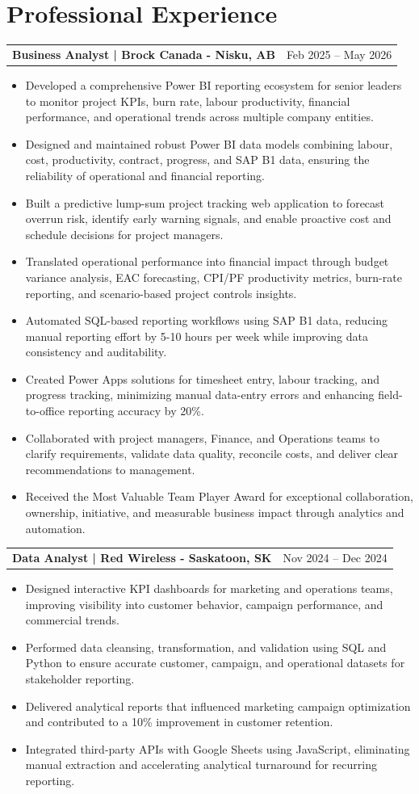 \documentclass[10.5pt,letterpaper]{article}
\makeatletter
\newcommand{\resumeRow}[2]{%
  \noindent\begin{tabularx}{\linewidth}{@{}X r@{}}
    \textbf{#1} & #2 \\
  \end{tabularx}%
}
\makeatother
\begin{document}
\section{Professional Experience}
\resumeRow{Business Analyst | Brock Canada - Nisku, AB}{Feb 2025 -- May 2026}
\begin{itemize}
  \item Developed a comprehensive Power BI reporting ecosystem for senior leaders to monitor project KPIs, burn rate, labour productivity, financial performance, and operational trends across multiple company entities.
  \item Designed and maintained robust Power BI data models combining labour, cost, productivity, contract, progress, and SAP B1 data, ensuring the reliability of operational and financial reporting.
  \item Built a predictive lump-sum project tracking web application to forecast overrun risk, identify early warning signals, and enable proactive cost and schedule decisions for project managers.
  \item Translated operational performance into financial impact through budget variance analysis, EAC forecasting, CPI/PF productivity metrics, burn-rate reporting, and scenario-based project controls insights.
  \item Automated SQL-based reporting workflows using SAP B1 data, reducing manual reporting effort by 5-10 hours per week while improving data consistency and auditability.
  \item Created Power Apps solutions for timesheet entry, labour tracking, and progress tracking, minimizing manual data-entry errors and enhancing field-to-office reporting accuracy by 20\%.
  \item Collaborated with project managers, Finance, and Operations teams to clarify requirements, validate data quality, reconcile costs, and deliver clear recommendations to management.
  \item Received the Most Valuable Team Player Award for exceptional collaboration, ownership, initiative, and measurable business impact through analytics and automation.
\end{itemize}
\resumeRow{Data Analyst | Red Wireless - Saskatoon, SK}{Nov 2024 -- Dec 2024}
\begin{itemize}
  \item Designed interactive KPI dashboards for marketing and operations teams, improving visibility into customer behavior, campaign performance, and commercial trends.
  \item Performed data cleansing, transformation, and validation using SQL and Python to ensure accurate customer, campaign, and operational datasets for stakeholder reporting.
  \item Delivered analytical reports that influenced marketing campaign optimization and contributed to a 10\% improvement in customer retention.
  \item Integrated third-party APIs with Google Sheets using JavaScript, eliminating manual extraction and accelerating analytical turnaround for recurring reporting.
\end{itemize}
\end{document}
